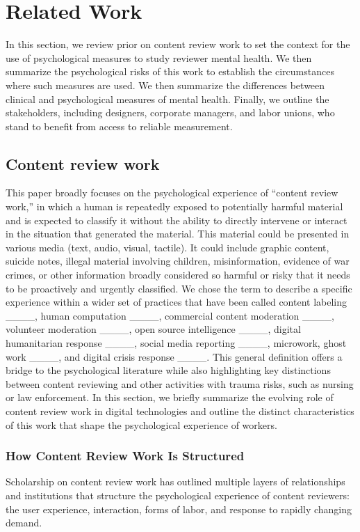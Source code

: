 \section{Related Work}
In this section, we review prior on content review work to set the context for the use of psychological measures to study reviewer mental health. We then summarize the psychological risks of this work to establish the circumstances where such measures are used. We then summarize the differences between clinical and psychological measures of mental health. Finally, we outline the stakeholders, including designers, corporate managers, and labor unions, who stand to benefit from access to reliable measurement.

\subsection{Content review work}
This paper broadly focuses on the psychological experience of ``content review work,'' in which a human is repeatedly exposed to potentially harmful material and is expected to classify it without the ability to directly intervene or interact in the situation that generated the material. This material could be presented in various media (text, audio, visual, tactile). It could include graphic content, suicide notes, illegal material involving children, misinformation, evidence of war crimes, or other information broadly considered so harmful or risky that it needs to be proactively and urgently classified. We chose the term to describe a specific experience within a wider set of practices that have been called content labeling ____, human computation ____, commercial content moderation ____, volunteer moderation ____, open source intelligence ____, digital humanitarian response ____, social media reporting ____, microwork, ghost work ____, and digital crisis response ____. This general definition offers a bridge to the psychological literature while also highlighting key distinctions between content reviewing and other activities with trauma risks, such as nursing or law enforcement. In this section, we briefly summarize the evolving role of content review work in digital technologies and outline the distinct characteristics of this work that shape the psychological experience of workers.

\subsubsection{How Content Review Work Is Structured}
Scholarship on content review work has outlined multiple layers of relationships and institutions that structure the psychological experience of content reviewers: the user experience, interaction, forms of labor, and response to rapidly changing demand.


